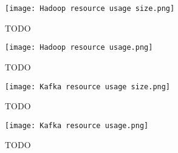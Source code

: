 \begin{figure}
    \texttt{[image: Hadoop resource usage size.png]}
    \caption{TODO}
\end{figure}

\begin{figure}
    \texttt{[image: Hadoop resource usage.png]}
    \caption{TODO}
\end{figure}

\begin{figure}
    \texttt{[image: Kafka resource usage size.png]}
    \caption{TODO}
\end{figure}

\begin{figure}
    \texttt{[image: Kafka resource usage.png]}
    \caption{TODO}
\end{figure}
